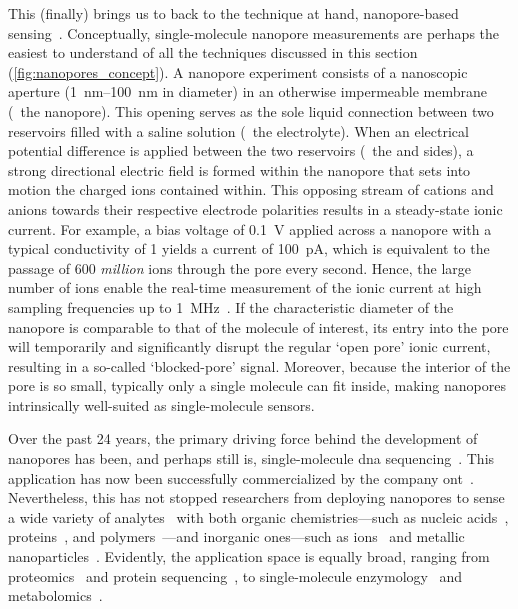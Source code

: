 This (finally) brings us to back to the technique at hand, nanopore-based
sensing~\cite{Howorka-2009,Wang-2018}. Conceptually, single-molecule nanopore measurements are perhaps the
easiest to understand of all the techniques discussed in this section (\cref{fig:nanopores_concept}). A
nanopore experiment consists of a nanoscopic aperture (\SIrange{1}{100}{\nm} in diameter) in an otherwise
impermeable membrane (\ie~the nanopore). This opening serves as the sole liquid connection between two
reservoirs filled with a saline solution (\ie~the electrolyte). When an electrical potential difference is
applied between the two reservoirs (\ie~the \cisi{} and \transi{} sides), a strong directional electric field
is formed within the nanopore that sets into motion the charged ions contained within. This opposing stream of
cations and anions towards their respective electrode polarities results in a steady-state ionic current. For
example, a bias voltage of \SI{0.1}{\volt} applied across a nanopore with a typical conductivity of
\SI{1}{\nS} yields a current of \SI{100}{\pA}, which is equivalent to the passage of \num{600} \emph{million}
ions through the pore every second. Hence, the large number of ions enable the real-time measurement of the
ionic current at high sampling frequencies up to \SI{1}{\mega\hertz}~\cite{Rosenstein-2012}. If the
characteristic diameter of the nanopore is comparable to that of the molecule of interest, its entry into the
pore will temporarily and significantly disrupt the regular `open pore' ionic current, resulting in a
so-called `blocked-pore' signal. Moreover, because the interior of the pore is so small, typically only a
single molecule can fit inside, making nanopores intrinsically well-suited as single-molecule sensors.

Over the past 24 years, the primary driving force behind the development of nanopores has been, and perhaps
still is, single-molecule \gls{dna} sequencing~\cite{Deamer-2016}. This application has now been successfully
commercialized by the company \gls{ont}~\cite{ONT-2020,Jain-2018}. Nevertheless, this has not stopped
researchers from deploying nanopores to sense a wide variety of analytes~\cite{Wang-2018} with both organic
chemistries---such as nucleic acids~\cite{Kasianowicz-1996,Meller-2000,Stoddart-2009,Manrao-2012},
proteins~\cite{Mohammad-2008,Firnkes-2010,Spiering-2011,RodriguezLarrea-2013}, and
polymers~\cite{Robertson-2007,Baaken-2011}---and inorganic ones---such as
ions~\cite{Bezrukov-1993,Kasianowicz-1995,Kasianowicz-1999,Ali-2011,Roozbahani-2020} and metallic
nanoparticles~\cite{Astier-2009,Angevine-2014,Campos-2018}. Evidently, the application space is equally broad,
ranging from proteomics~\cite{Yusko-2017,Houghtaling-2019} and protein
sequencing~\cite{Restrepo-Perez-2018,Huang-2019}, to single-molecule
enzymology~\cite{Willems-VanMeervelt-2017,Ho-2015,Wloka-2017,Harrington-2019,Galenkamp-2020} and
metabolomics~\cite{VanMeervelt-2017,Zernia-2020}.

